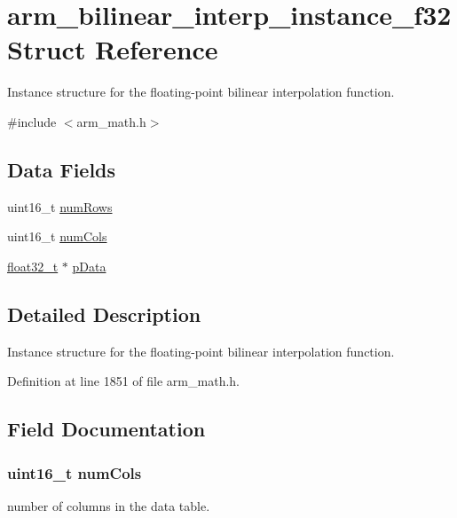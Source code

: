 \hypertarget{structarm__bilinear__interp__instance__f32}{}\section{arm\+\_\+bilinear\+\_\+interp\+\_\+instance\+\_\+f32 Struct Reference}
\label{structarm__bilinear__interp__instance__f32}


Instance structure for the floating-\/point bilinear interpolation function.  




{\ttfamily \#include $<$arm\+\_\+math.\+h$>$}

\subsection*{Data Fields}
\begin{DoxyCompactItemize}
\item 
uint16\+\_\+t \hyperlink{structarm__bilinear__interp__instance__f32_a1bcf80ccdc2acc29198f1592ae300390}{num\+Rows}
\item 
uint16\+\_\+t \hyperlink{structarm__bilinear__interp__instance__f32_a4bb5ec0d13eb4c9cf887aa8366a44117}{num\+Cols}
\item 
\hyperlink{arm__math_8h_a4611b605e45ab401f02cab15c5e38715}{float32\+\_\+t} $\ast$ \hyperlink{structarm__bilinear__interp__instance__f32_af5c3a2f15c98850cdcfbe6f87e5ac5df}{p\+Data}
\end{DoxyCompactItemize}


\subsection{Detailed Description}
Instance structure for the floating-\/point bilinear interpolation function. 

Definition at line 1851 of file arm\+\_\+math.\+h.



\subsection{Field Documentation}
\subsubsection[{\texorpdfstring{num\+Cols}{numCols}}]{\setlength{\rightskip}{0pt plus 5cm}uint16\+\_\+t num\+Cols}\hypertarget{structarm__bilinear__interp__instance__f32_a4bb5ec0d13eb4c9cf887aa8366a44117}{}\label{structarm__bilinear__interp__instance__f32_a4bb5ec0d13eb4c9cf887aa8366a44117}
number of columns in the data table. 

